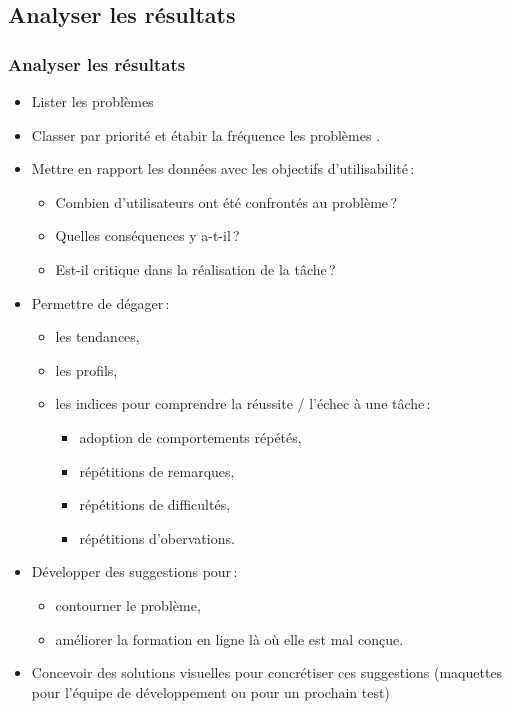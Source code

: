 	\subsection{Analyser les résultats} 
		\begin{frame}[allowframebreaks]
		\frametitle{Analyser les résultats \citep{ergolab2014a}}
			\begin {itemize}
				      \item Lister les problèmes 
				      \item Classer par priorité et étabir la fréquence les problèmes . 
				      \item Mettre en rapport les données avec les objectifs d'utilisabilité\,: 
				      		\begin {itemize}
				      		\item Combien d'utilisateurs ont été confrontés au problème\,? 
				      		\item Quelles conséquences y a-t-il\,? 
				      		\item Est-il critique dans la réalisation de la tâche\,?
				      		\end{itemize}
				  	\item Permettre de dégager\,: 
				  		\begin {itemize}
				      		\item les tendances,
				      		\item les profils,
				      		\item les indices pour comprendre la réussite / l'échec à une tâche\,:
				      			\begin {itemize}
				      			\item adoption de comportements répétés,
				      			\item répétitions de remarques,
				      			\item répétitions de difficultés,
				      			\item répétitions d'obervations.
				      			\end{itemize}
						\end{itemize}
				      		\item Développer des suggestions pour\,:
				      			\begin {itemize}
				      			\item contourner le problème, 
				      			\item améliorer la formation en ligne là où elle est mal conçue.
				      			\end{itemize}
						\item Concevoir des solutions visuelles pour concrétiser ces suggestions (maquettes pour l'équipe de développement ou pour un prochain test) 
				      		
				\end{itemize}
		\end{frame}    	

